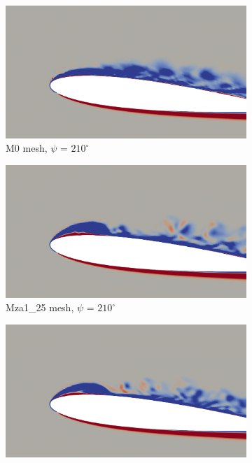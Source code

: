 \begin{figure}[H]
	\centering
	\begin{center}
		\begin{subfigure}[b]{0.475\textwidth}
		\centering
		\includegraphics[width=1\textwidth]{figures/zonal_adapt_results/vorticity_plots/v2/M0/spavg/phase_210.png}
		\caption{M0 mesh, $\psi$ = $210^\circ$}
		\label{fig:M0_sp_psi210}
		\end{subfigure}
	\end{center}
	\begin{subfigure}[b]{0.475\textwidth}
	\centering
	\includegraphics[width=1\textwidth]{figures/zonal_adapt_results/vorticity_plots/v2/Mza1_25/spavg/phase_210.png}
	\caption{Mza1\_25 mesh, $\psi$ = $210^\circ$}
	\label{fig:Mza1_25_sp_psi210}
	\end{subfigure}
	\begin{subfigure}[b]{0.475\textwidth}
		\centering
		\includegraphics[width=1\textwidth]{figures/zonal_adapt_results/vorticity_plots/v2/Mza1_50/spavg/phase_210.png}

\end{subfigure}
\end{figure}
